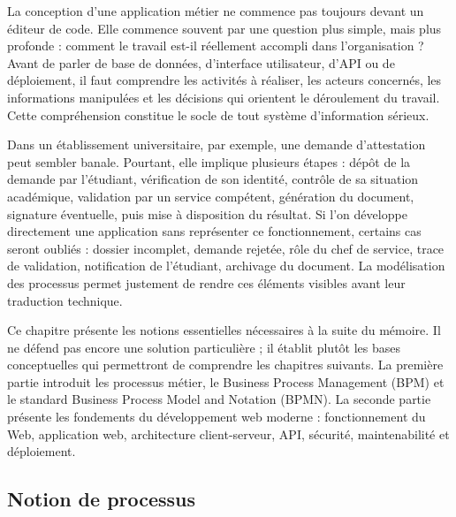 \label{chap:services_composition_generalities}


La conception d'une application métier ne commence pas toujours devant un éditeur de code. Elle commence souvent par une question plus simple, mais plus profonde : comment le travail est-il réellement accompli dans l'organisation ? Avant de parler de base de données, d'interface utilisateur, d'API ou de déploiement, il faut comprendre les activités à réaliser, les acteurs concernés, les informations manipulées et les décisions qui orientent le déroulement du travail. Cette compréhension constitue le socle de tout système d'information sérieux.

Dans un établissement universitaire, par exemple, une demande d'attestation peut sembler banale. Pourtant, elle implique plusieurs étapes : dépôt de la demande par l'étudiant, vérification de son identité, contrôle de sa situation académique, validation par un service compétent, génération du document, signature éventuelle, puis mise à disposition du résultat. Si l'on développe directement une application sans représenter ce fonctionnement, certains cas seront oubliés : dossier incomplet, demande rejetée, rôle du chef de service, trace de validation, notification de l'étudiant, archivage du document. La modélisation des processus permet justement de rendre ces éléments visibles avant leur traduction technique.

Ce chapitre présente les notions essentielles nécessaires à la suite du mémoire. Il ne défend pas encore une solution particulière ; il établit plutôt les bases conceptuelles qui permettront de comprendre les chapitres suivants. La première partie introduit les processus métier, le Business Process Management (BPM) et le standard Business Process Model and Notation (BPMN). La seconde partie présente les fondements du développement web moderne : fonctionnement du Web, application web, architecture client-serveur, API, sécurité, maintenabilité et déploiement.

\label{sec:calcul_orientee_service}

\subsection{Notion de processus}{}
\label{subsec:evolution_high_performance}

